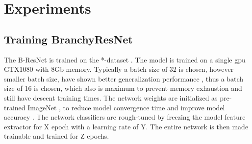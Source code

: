 \chapter{Experiments}

\section{Training BranchyResNet}

The B-ResNet is trained on the *-dataset \cite{dataset}. The model is trained on a single \gls{gpu} GTX1080 with 8Gb memory. Typically a batch size of 32 is chosen, however smaller batch size, have shown better generalization performance \cite{masters_revisiting_nodate}, thus a batch size of 16 is chosen, which also is maximum to prevent memory exhaustion and still have descent training times. The network weights are initialized as pre-trained ImageNet \cite{deng_imagenet:_2009}, to reduce model convergence time and improve model accuracy \cite{yosinski_how_2014}. The network classifiers are rough-tuned by freezing the model feature extractor for X epoch with a learning rate of Y. The entire network is then made trainable and trained for Z epochs.

